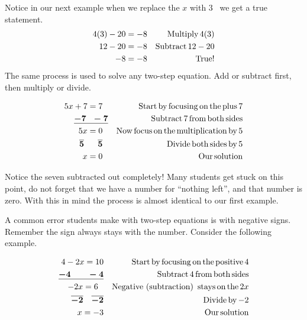  Notice in our next example when we replace the $x$ with $3$ \ we get a true
statement.
\begin{eqnarray*}
  4 (3) - 20 = - 8 &  & \operatorname{Multiply} 4 (3)\\
  12 - 20 = - 8 &  & \operatorname{Subtract} 12 - 20\\
  - 8 = - 8 &  & \operatorname{True} !
\end{eqnarray*}
 The same process is used to solve any two-step equation. Add or subtract
first, then multiply or divide.

\begin{example}\label{Lin14}
  
  \begin{eqnarray*}
    5 x + 7 = 7~~ &  & \operatorname{Start} \operatorname{by} \operatorname{focusing} \operatorname{on}
    \operatorname{the} \operatorname{plus} 7\\
    \boldsymbol{\underline{- 7 ~~- 7}} &  & \operatorname{Subtract} 7 \operatorname{from}
    \operatorname{both} \operatorname{sides}\\
    5 x = 0~~ &  & \operatorname{Now} \operatorname{focus} \operatorname{on} \operatorname{the}
    \operatorname{multiplication} \operatorname{by} 5\\
    \boldsymbol{\overline{5} ~~~~~ \overline{5}}~~ &  & \operatorname{Divide} \operatorname{both}
    \operatorname{sides} \operatorname{by} 5\\
    x = 0~~ &  & \operatorname{Our} \operatorname{solution}
  \end{eqnarray*}
\end{example}

Notice the seven subtracted out completely! Many students get stuck on this
point, do not forget that we have a number for ``nothing left'', and that
number is zero. With this in mind the process is almost identical to our first
example.\pp

 A common error students make with two-step equations is with negative signs.
Remember the sign always stays with the number. Consider the following
example.

\begin{example}\label{Lin15}
 
   \begin{eqnarray*}
    4 - 2 x = 10 &  & \operatorname{Start} \operatorname{by} \operatorname{focusing} \operatorname{on}
    \operatorname{the} \operatorname{positive} 4\\
    \underline{\boldsymbol{- 4 ~~~~~~- 4}} &  & \operatorname{Subtract} 4 \operatorname{from}
    \operatorname{both} \operatorname{sides}\\
    - 2 x = 6~~ &  & \operatorname{Negative~} (\operatorname{subtraction}) \operatorname{~stays} \operatorname{on}
    \operatorname{the} 2 x\\
    \boldsymbol{\overline{- 2} ~~~ \overline{- 2}} &  & \operatorname{Divide} \operatorname{by} -
    2\\
    x = - 3 &  & \operatorname{Our} \operatorname{solution}
  \end{eqnarray*}
\end{example}

